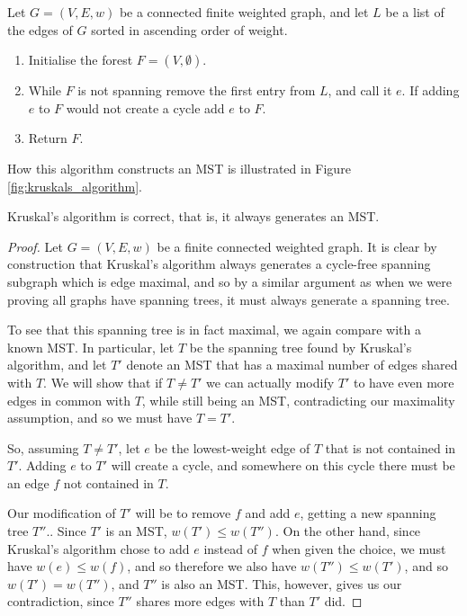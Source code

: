 \documentclass[nobib]{tufte-handout}
\begin{document}
\begin{definition}
  Let $G = (V,E,w)$ be a connected finite weighted graph, and let $L$ be a list of the edges of $G$ sorted in ascending order of weight.
  \begin{enumerate}
      \item Initialise the forest $F = (V, \emptyset)$. 
      \item While $F$ is not spanning remove the first entry from $L$, and call it $e$. If adding $e$ to $F$ would not create a cycle add $e$ to $F$.
      \item Return $F$.
    \end{enumerate}
  How this algorithm constructs an MST is illustrated in Figure \ref{fig:kruskals_algorithm}.
\end{definition}

\begin{theorem}
  Kruskal's algorithm is correct, that is, it always generates an MST.

  \begin{proof}
    Let $G = (V,E,w)$ be a finite connected weighted graph. It is clear by construction that Kruskal's algorithm always generates a cycle-free spanning subgraph which is edge maximal, and so by a similar argument as when we were proving all graphs have spanning trees, it must always generate a spanning tree.

    To see that this spanning tree is in fact maximal, we again compare with a known MST. In particular, let $T$ be the spanning tree found by Kruskal's algorithm, and let $T'$ denote an MST that has a maximal number of edges shared with $T$. We will show that if $T \neq T'$ we can actually modify $T'$ to have even more edges in common with $T$, while still being an MST, contradicting our maximality assumption, and so we must have $T = T'$.

    So, assuming $T \neq T'$, let $e$ be the lowest-weight edge of $T$ that is not contained in $T'$. Adding $e$ to $T'$ will create a cycle, and somewhere on this cycle there must be an edge $f$ not contained in $T$.

    Our modification of $T'$ will be to remove $f$ and add $e$, getting a new spanning tree $T''$.. Since $T'$ is an MST, $w(T') \leq w(T'')$. On the other hand, since Kruskal's algorithm chose to add $e$ instead of $f$ when given the choice, we must have $w(e) \leq w(f)$, and so therefore we also have $w(T'') \leq w(T')$, and so $w(T') = w(T'')$, and $T''$ is also an MST. This, however, gives us our contradiction, since $T''$ shares more edges with $T$ than $T'$ did.
  \end{proof}
\end{theorem}
\end{document}

